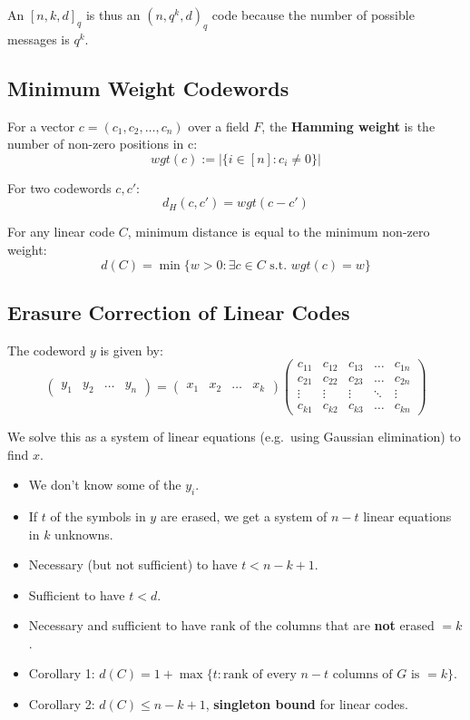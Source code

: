 \documentclass[11pt]{article}
\begin{document}
An $[n, k, d]_q$ is thus an $(n, q^k, d)_q$ code because the number of possible messages is $q^k$.

\subsection{Minimum Weight Codewords}
For a vector $c = (c_1, c_2, \ldots, c_n)$ over a field $F$, the \textbf{Hamming weight} is the number of non-zero positions in c:
\[
  wgt(c) := \lvert \{ i \in [n] : c_i \neq 0 \} \rvert
\]

For two codewords $c, c'$:
\[
  d_H(c, c') = wgt(c - c')
\]

For any linear code $C$, minimum distance is equal to the minimum non-zero weight:
\[
  d(C) = \min \{ w > 0 : \exists c \in C \text{ s.t. } wgt(c) = w \}
\]

\subsection{Erasure Correction of Linear Codes}
The codeword $y$ is given by:
\[
  \begin{pmatrix}
    y_1 & y_2 & \dots & y_n
  \end{pmatrix}
  =
  \begin{pmatrix}
    x_1 & x_2 & \dots & x_k
  \end{pmatrix}
  \begin{pmatrix}
    c_{11} & c_{12} & c_{13} & \dots  & c_{1n} \\
    c_{21} & c_{22} & c_{23} & \dots  & c_{2n} \\
    \vdots & \vdots & \vdots & \ddots & \vdots \\
    c_{k1} & c_{k2} & c_{k3} & \dots  & c_{kn}
  \end{pmatrix}
\]

We solve this as a system of linear equations (e.g.\ using Gaussian elimination) to find $x$.
\begin{itemize}
  \item We don't know some of the $y_i$.
  \item If $t$ of the symbols in $y$ are erased, we get a system of $n - t$ linear equations in $k$ unknowns.
  \item Necessary (but not sufficient) to have $t < n - k + 1$.
  \item Sufficient to have $t < d$.
  \item Necessary and sufficient to have rank of the columns that are \textbf{not} erased $= k$.
  \item Corollary 1: $d(C) = 1 + \max \{ t : \text{rank of every } n - t \text{ columns of } G \text{ is } = k\}$.
  \item Corollary 2: $d(C) \leq n - k + 1$, \textbf{singleton bound} for linear codes.
\end{itemize}
\end{document}
